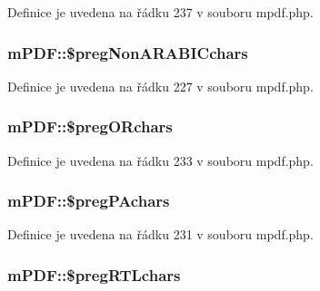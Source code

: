 Definice je uvedena na řádku 237 v souboru mpdf.\-php.

\hypertarget{classm_p_d_f_ac88b8cf03e051527ee9b078f1c66b742}{
\subsubsection[{\$preg\-Non\-A\-R\-A\-B\-I\-Cchars}]{\setlength{\rightskip}{0pt plus 5cm}m\-P\-D\-F\-::\$preg\-Non\-A\-R\-A\-B\-I\-Cchars}}\label{classm_p_d_f_ac88b8cf03e051527ee9b078f1c66b742}


Definice je uvedena na řádku 227 v souboru mpdf.\-php.

\hypertarget{classm_p_d_f_ae856de52b390e162207559a30fa50524}{
\subsubsection[{\$preg\-O\-Rchars}]{\setlength{\rightskip}{0pt plus 5cm}m\-P\-D\-F\-::\$preg\-O\-Rchars}}\label{classm_p_d_f_ae856de52b390e162207559a30fa50524}


Definice je uvedena na řádku 233 v souboru mpdf.\-php.

\hypertarget{classm_p_d_f_a425a2819ff024a0bf9fbdff363b304a3}{
\subsubsection[{\$preg\-P\-Achars}]{\setlength{\rightskip}{0pt plus 5cm}m\-P\-D\-F\-::\$preg\-P\-Achars}}\label{classm_p_d_f_a425a2819ff024a0bf9fbdff363b304a3}


Definice je uvedena na řádku 231 v souboru mpdf.\-php.

\hypertarget{classm_p_d_f_a26f3647a0abacee981fb62e9facd8f63}{
\subsubsection[{\$preg\-R\-T\-Lchars}]{\setlength{\rightskip}{0pt plus 5cm}m\-P\-D\-F\-::\$preg\-R\-T\-Lchars}}\label{classm_p_d_f_a26f3647a0abacee981fb62e9facd8f63}


